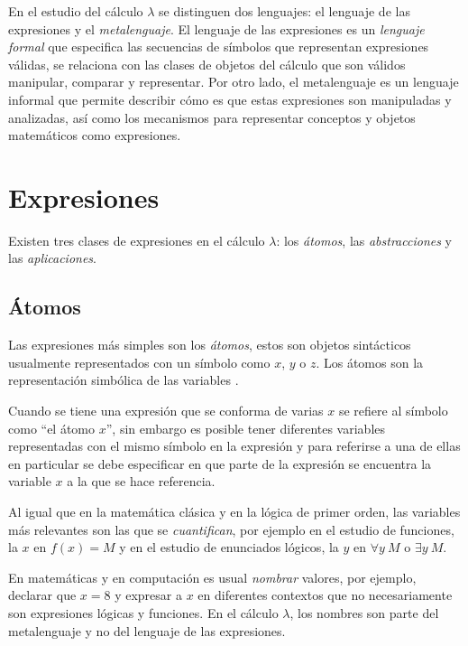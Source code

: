 En el estudio del cálculo \( λ \) se distinguen dos lenguajes: el lenguaje de las expresiones y el \emph{metalenguaje}. El lenguaje de las expresiones es un \emph{lenguaje formal} que especifica las secuencias de símbolos que representan expresiones válidas, se relaciona con las clases de objetos del cálculo que son válidos manipular, comparar y representar. Por otro lado, el metalenguaje es un lenguaje informal que permite describir cómo es que estas expresiones son manipuladas y analizadas, así como los mecanismos para representar conceptos y objetos matemáticos como expresiones.

\section{Expresiones}
\label{sec:expresiones}

Existen tres clases de expresiones en el cálculo \( λ \): los \emph{átomos}, las \emph{abstracciones} y las \emph{aplicaciones}.

\subsection{Átomos}
\label{sec:atomos}

Las expresiones más simples son los \emph{átomos}, estos son objetos sintácticos usualmente representados con un símbolo como \( x \), \( y \) o \( z \). Los átomos son la representación simbólica de las variables \cite[p.~577]{Barendregt:Bible}.

Cuando se tiene una expresión que se conforma de varias \( x \) se refiere al símbolo como ``el átomo \( x \)'', sin embargo es posible tener diferentes variables representadas con el mismo símbolo en la expresión y para referirse a una de ellas en particular se debe especificar en que parte de la expresión se encuentra la variable \( x \) a la que se hace referencia.

Al igual que en la matemática clásica y en la lógica de primer orden, las variables más relevantes son las que se \emph{cuantifican}, por ejemplo en el estudio de funciones, la \( x \) en \( f(x) = M \) y en el estudio de enunciados lógicos, la \( y \) en \( \forall y\ M \) o \( \exists y\ M \).

En matemáticas y en computación es usual \emph{nombrar} valores, por ejemplo, declarar que \( x = 8 \) y expresar a \( x \) en diferentes contextos que no necesariamente son expresiones lógicas y funciones. En el cálculo \( λ \), los nombres son parte del metalenguaje y no del lenguaje de las expresiones.

